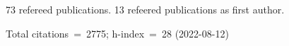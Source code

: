 73 refereed publications. 13 refeered publications as first author.

Total citations~=~2775; h-index~=~28 (2022-08-12)